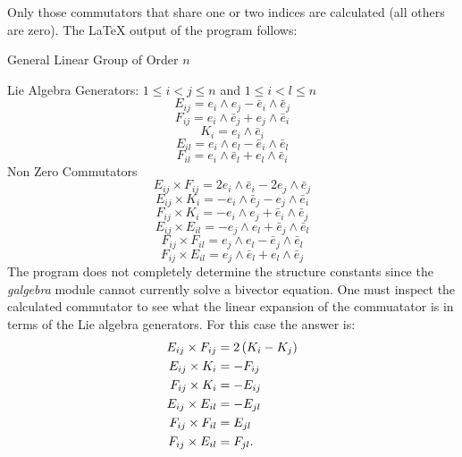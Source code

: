 Only those commutators that share one or two indices are calculated (all others are zero).  The
{\LaTeX}  output of the program follows:\newline

\centerline{General Linear Group of Order $n$\newline}
Lie Algebra Generators: $1\le i < j \le n$ and $1 \le i < l \le n$
\begin{equation*} E_{ij}  =  e_{i}\wedge e_{j} - \bar{e}_{i}\wedge \bar{e}_{j} \end{equation*}
\begin{equation*} F_{ij}  =  e_{i}\wedge \bar{e}_{j} + e_{j}\wedge \bar{e}_{i} \end{equation*}
\begin{equation*} K_{i}  =  e_{i}\wedge \bar{e}_{i} \end{equation*}
\begin{equation*} E_{il}  =  e_{i}\wedge e_{l} - \bar{e}_{i}\wedge \bar{e}_{l} \end{equation*}
\begin{equation*} F_{il}  =  e_{i}\wedge \bar{e}_{l} + e_{l}\wedge \bar{e}_{i} \end{equation*}
Non Zero Commutators
\begin{equation*} E_{ij}  \times F_{ij}  = 2 e_{i}\wedge \bar{e}_{i} -2 e_{j}\wedge \bar{e}_{j} \end{equation*}
\begin{equation*} E_{ij}  \times K_{i}  = - e_{i}\wedge \bar{e}_{j} - e_{j}\wedge \bar{e}_{i} \end{equation*}
\begin{equation*} F_{ij}  \times K_{i}  = - e_{i}\wedge e_{j} + \bar{e}_{i}\wedge \bar{e}_{j} \end{equation*}
\begin{equation*} E_{ij}  \times E_{il}  = - e_{j}\wedge e_{l} + \bar{e}_{j}\wedge \bar{e}_{l} \end{equation*}
\begin{equation*} F_{ij}  \times F_{il}  =  e_{j}\wedge e_{l} - \bar{e}_{j}\wedge \bar{e}_{l} \end{equation*}
\begin{equation*} F_{ij}  \times E_{il}  =  e_{j}\wedge \bar{e}_{l} + e_{l}\wedge \bar{e}_{j} \end{equation*}
The program does not completely determine the structure constants since the \emph{galgebra} module cannot currently
solve a bivector equation. One must inspect the calculated commutator to see what the linear expansion of the 
commuatator is in terms of the Lie algebra generators. For this case the answer is:
\begin{align}
	E_{ij}  \times F_{ij} &=  2\left ( {K_{i}-K_{j}} \right )\\
	E_{ij}  \times K_{i}  &= -F_{ij}\\
	F_{ij}  \times K_{i}  &= -E_{ij}\\
	E_{ij}  \times E_{il} &= -E_{jl}\\
	F_{ij}  \times F_{il} &= E_{jl}\\
	F_{ij}  \times E_{il} &= F_{jl}.
\end{align}

